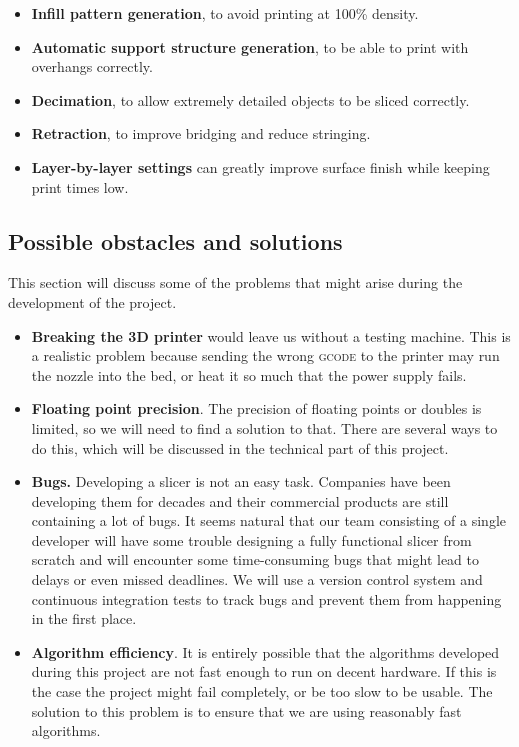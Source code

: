 \begin{itemize}
    \item \textbf{Infill pattern generation}, to avoid printing at 100\% density.
    \item \textbf{Automatic support structure generation}, to be able to print with overhangs correctly.
    \item \textbf{Decimation}, to allow extremely detailed objects to be sliced correctly.
    \item \textbf{Retraction}, to improve bridging and reduce stringing.
    \item \textbf{Layer-by-layer settings} can greatly improve surface finish while keeping print times low.
\end{itemize}


\subsection{Possible obstacles and solutions}
This section will discuss some of the problems that might arise during the development of the project.

\begin{itemize}
    \item \textbf{Breaking the 3D printer} would leave us without a testing machine. This is a realistic problem because sending the wrong \textsc{gcode} to the printer may run the nozzle into the bed, or heat it so much that the power supply fails.
    \item \textbf{Floating point precision}. The precision of floating points or doubles is limited, so we will need to find a solution to that. There are several ways to do this, which will be discussed in the technical part of this project.
    \item \textbf{Bugs.} Developing a slicer is not an easy task. Companies have been developing them for decades and their commercial products are still containing a lot of bugs. It seems natural that our team consisting of a single developer will have some trouble designing a fully functional slicer from scratch and will encounter some time-consuming bugs that might lead to delays or even missed deadlines. We will use a version control system and continuous integration tests to track bugs and prevent them from happening in the first place.
    \item \textbf{Algorithm efficiency}. It is entirely possible that the algorithms developed during this project are not fast enough to run on decent hardware. If this is the case the project might fail completely, or be too slow to be usable. The solution to this problem is to ensure that we are using reasonably fast algorithms.
\end{itemize}

